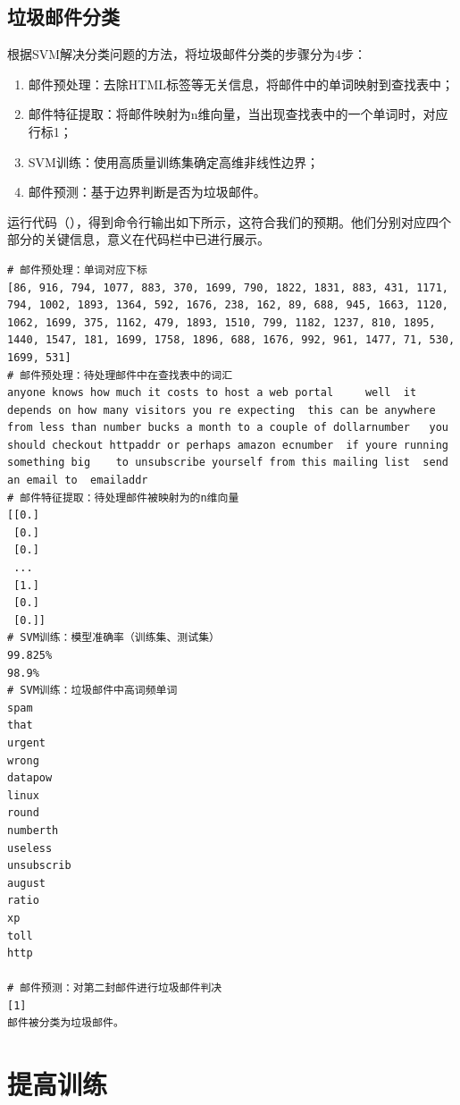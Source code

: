 \documentclass{SEU-AI-Report}
\begin{document}
\subsection{垃圾邮件分类}


根据SVM解决分类问题的方法，将垃圾邮件分类的步骤分为4步：
\begin{enumerate}
    \item 邮件预处理：去除HTML标签等无关信息，将邮件中的单词映射到查找表中；
    \item 邮件特征提取：将邮件映射为n维向量，当出现查找表中的一个单词时，对应行标1；
    \item SVM训练：使用高质量训练集确定高维非线性边界；
    \item 邮件预测：基于边界判断是否为垃圾邮件。
\end{enumerate}

运行代码（），得到命令行输出如下所示，这符合我们的预期。他们分别对应四个部分的关键信息，意义在代码栏中已进行展示。
\begin{lstlisting}[style = bashstyle]
# 邮件预处理：单词对应下标
[86, 916, 794, 1077, 883, 370, 1699, 790, 1822, 1831, 883, 431, 1171, 794, 1002, 1893, 1364, 592, 1676, 238, 162, 89, 688, 945, 1663, 1120, 1062, 1699, 375, 1162, 479, 1893, 1510, 799, 1182, 1237, 810, 1895, 1440, 1547, 181, 1699, 1758, 1896, 688, 1676, 992, 961, 1477, 71, 530, 1699, 531]
# 邮件预处理：待处理邮件中在查找表中的词汇
anyone knows how much it costs to host a web portal     well  it depends on how many visitors you re expecting  this can be anywhere from less than number bucks a month to a couple of dollarnumber   you should checkout httpaddr or perhaps amazon ecnumber  if youre running something big    to unsubscribe yourself from this mailing list  send an email to  emailaddr  
# 邮件特征提取：待处理邮件被映射为的n维向量
[[0.]
 [0.]
 [0.]
 ...
 [1.]
 [0.]
 [0.]]
# SVM训练：模型准确率（训练集、测试集）
99.825%
98.9%
# SVM训练：垃圾邮件中高词频单词
spam
that
urgent
wrong
datapow
linux
round
numberth
useless
unsubscrib
august
ratio
xp
toll
http

# 邮件预测：对第二封邮件进行垃圾邮件判决
[1]
邮件被分类为垃圾邮件。
\end{lstlisting}
\section{提高训练}
\end{document}
